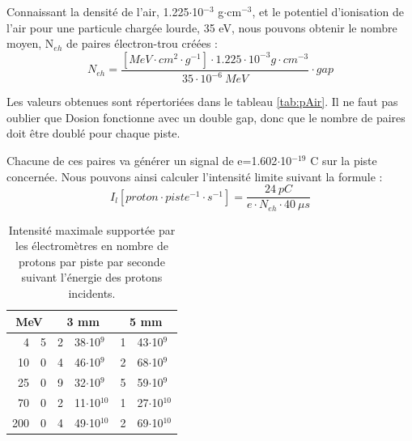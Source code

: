 \documentclass[a4paper,11pt]{article}
\begin{document}
Connaissant la densité de l'air, 1.225$\cdot$10$^{-3}$ g$\cdot$cm$^{-3}$, et le potentiel d'ionisation de l'air pour une particule chargée lourde, 35 eV, nous pouvons obtenir le nombre moyen, N$_{eh}$ de paires électron-trou créées :
$$N_{eh}=\frac{[MeV\cdot cm^2\cdot g^{-1}]\cdot 1.225\cdot 10^{-3} g\cdot cm^{-3}}{35\cdot 10^{-6}\ MeV}\cdot gap$$

Les valeurs obtenues sont répertoriées dans le tableau \ref{tab:pAir}.
Il ne faut pas oublier que Dosion fonctionne avec un double gap, donc que le nombre de paires doit être doublé pour chaque piste.

Chacune de ces paires va générer un signal de e=1.602$\cdot$10$^{-19}$ C sur la piste concernée.
Nous pouvons ainsi calculer l'intensité limite  suivant la formule :
$$I_l[proton\cdot piste^{-1}\cdot s^{-1}]=\frac{24\ pC}{e\cdot N_{eh}\cdot 40\ \mu s}$$

\begin{table}[h]
\begin{center}
\begin{tabular}{r@{.}lr@{.}lr@{.}l}
\multicolumn{2}{c}{MeV}&\multicolumn{2}{c}{3 mm}&\multicolumn{2}{c}{5 mm}\\
\hline
\hline
4&5&\hspace*{3ex}2&38$\cdot$10$^9$&\hspace*{3ex}1&43$\cdot$10$^9$\\
10&0&4&46$\cdot$10$^9$&2&68$\cdot$10$^9$\\
25&0&9&32$\cdot$10$^9$&5&59$\cdot$10$^9$\\
70&0&2&11$\cdot$10$^{10}$&1&27$\cdot$10$^{10}$\\
200&0&4&49$\cdot$10$^{10}$&2&69$\cdot$10$^{10}$\\
\hline
\end{tabular}
\caption{\label{tab:pAirI}\footnotesize{Intensité maximale supportée par les électromètres en nombre de protons par piste par seconde suivant l'énergie des protons incidents.}}
\end{center}
\end{table}
\end{document}
